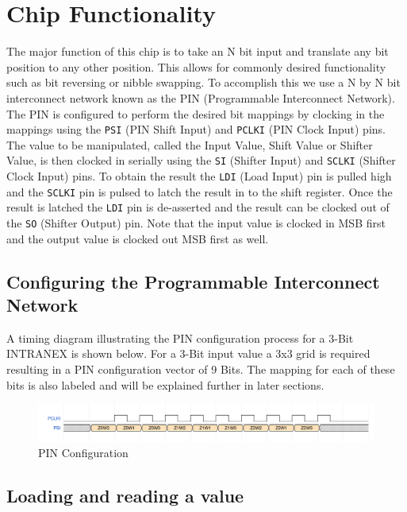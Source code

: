 \documentclass{article}
\begin{document}
\newpage
\section{Chip Functionality}

The major function of this chip is to take an N bit input and translate any bit
position to any other position. This allows for commonly desired functionality
such as bit reversing or nibble swapping. To accomplish this we use a N by N
bit interconnect network known as the PIN (Programmable Interconnect Network).
The PIN is configured to perform the desired bit mappings by clocking in the
mappings using the \texttt{PSI} (PIN Shift Input) and \texttt{PCLKI} (PIN Clock
Input) pins.  The value to be manipulated, called  the Input Value, Shift Value
or Shifter Value, is then clocked in serially using the \texttt{SI} (Shifter
Input) and \texttt{SCLKI} (Shifter Clock Input) pins. To obtain the result the
\texttt{LDI} (Load Input) pin is pulled high and the \texttt{SCLKI} pin is
pulsed to latch the result in to the shift register. Once the result is latched
the \texttt{LDI} pin is de-asserted and the result can be clocked out of the
\texttt{SO} (Shifter Output) pin. Note that the input value is clocked in MSB
first and the output value is clocked out MSB first as well.

\subsection{Configuring the Programmable Interconnect Network}

A timing diagram illustrating the PIN configuration process for a 3-Bit
INTRANEX is shown below. For a 3-Bit input value a 3x3 grid is required
resulting in a PIN configuration vector of 9 Bits. The mapping for each of
these bits is also labeled and will be explained further in later sections.

\begin{figure}[H]
    \centering
    \includegraphics[width=\linewidth]{../waveforms/pin.png}
    \caption{PIN Configuration}
\end{figure}

\subsection{Loading and reading a value}
\end{document}

